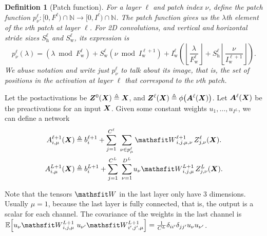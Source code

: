 \documentclass{article} %
\newcommand{\bracket}[3]{{\left#1 #3 \right#2}}
\newcommand{\bra}{\bracket{(}{)}}
\newcommand{\sqb}{\bracket{[}{]}}
\newcommand{\floor}{\bracket{\lfloor}{\rfloor}}
\newcommand{\ssup}[1]{^{#1}}
\newcommand{\eqdef}{\triangleq}
\newcommand{\patch}[2]{{p\ssup{#1}_{#2}}}
\newcommand{\p}[2]{{\patch{\ell #1}{\nu #2}\bra{\lambda}}}
\newcommand{\Iw}[1]{{I\ssup{#1}_\text{w}}}
\newcommand{\Iwl}[1]{\Iw{\ell #1}}
\newcommand{\Sw}[1]{{S\ssup{#1}_\text{w}}}
\newcommand{\Swl}[1]{\Sw{\ell #1}}
\newcommand{\Sh}[1]{{S\ssup{#1}_\text{h}}}
\newcommand{\Shl}[1]{\Sh{\ell #1}}
\newcommand{\Fw}[1]{{F\ssup{#1}_\text{w}}}
\newcommand{\Fwl}[1]{\Fw{\ell #1}}
\newtheorem{definition}[theorem]{Definition}
\begin{document}
\begin{definition}[Patch function]
  For a layer $\ell$ and patch index $\nu$, define the patch function $p\ssup{\ell}_\nu: [0, F\ssup{\ell})
  \cap \mathbb{N} \to [0, I\ssup{\ell}) \cap \mathbb{N}$.
  The patch function gives us the $\lambda$th element of the $\nu$th patch at layer
  $\ell$. For 2D convolutions, and vertical and horizontal stride sizes $\Shl{}$ and $\Swl{}$,
  its expression is
  \begin{equation}
    \p{}{}{}
    = \bra{\lambda \bmod \Fwl{}} + \Swl{}\bra{\nu\bmod \Iwl{+1}}
    + \Iwl{}\bra{\floor{\frac{\lambda}{\Fwl{}}} + \Shl{} \floor{\frac{\nu}{\Iwl{+1}}}}.
  \end{equation}
  We abuse notation and write just $p\ssup{\ell}_\nu$ to talk about its image, that is,
  the set of positions in the activation at layer $\ell$ that correspond to the $\nu$th patch.
  \label{def:patch-function}
\end{definition}



Let the postactivations be $\mZ\ssup{0}(\mX) \eqdef \mX$, and
$\mZ\ssup{\ell}(\mX) \eqdef \phi\bra{\mA\ssup{\ell}(\mX)}$. Let
$\mA\ssup{\ell}(\mX)$ be the preactivations for an input ${\bm{X}}$. Given some
constant weights ${u_1, \dots, u_{I\ssup{L}}}$, we can define a network
\begin{align}
  \emA_{i,\mu}\ssup{\ell+1}(\mX) &\eqdef \evb_i\ssup{\ell+1} +
  \sum_{j=1}^{C\ssup{\ell}} \ \sum_{\nu\in\patch{\ell}{\mu}} \etW\ssup{\ell+1}_{i,j,\mu,\nu}\, \emZ\ssup{\ell}_{j,\nu}(\mX).
  \label{eq:convgp-network-recursive} \\
  \emA_{i,\mu}\ssup{L+1}(\mX) &\eqdef \evb_i\ssup{L+1} +
                                   \sum_{j=1}^{C\ssup{L}} \ \sum_{\nu=1}^{D\ssup{L}} u_\nu \etW\ssup{L+1}_{i,j,\mu}\, \emZ\ssup{L}_{j,\nu}(\mX).
                                   \label{eq:convgp-network-final}
\end{align}

Note that the tensors $\etW$ in the last layer only have 3 dimensions. Usually
$\mu=1$, because the last layer is fully connected, that is, the output is a
scalar for each channel. The covariance of the weights in the last channel is
$\E\sqb{u_\nu\etW\ssup{L+1}_{i,j,\mu}\ u_{\nu'}\etW\ssup{L+1}_{i',j',\mu}} =
\frac{1}{C\ssup{L}}\delta_{ii'}\delta_{jj'}\evu_\nu \evu_{\nu'}$.
\end{document}
